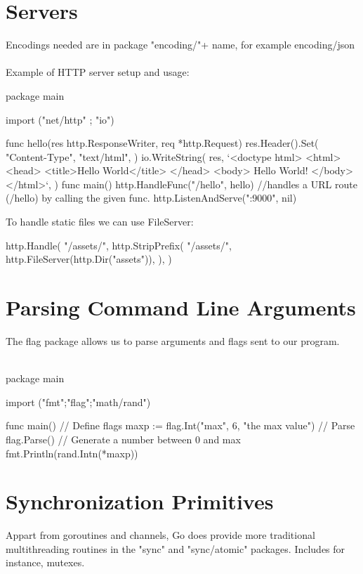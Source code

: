 \documentclass[twoside,a4paper,english]{report}
\begin{document}
\section{Servers}
Encodings needed are in package "encoding/"+ name, for example encoding/json\\\\
Example of HTTP server setup and usage:
\begin{go}
package main

import ("net/http" ; "io")

func hello(res http.ResponseWriter, req *http.Request) {
     res.Header().Set(
           "Content-Type",
           "text/html",
     )
     io.WriteString(
           res,
           `<doctype html>
<html>
  <head>
    <title>Hello World</title>
  </head>
     <body>
           Hello World!
     </body>
</html>`,
    ) 
}
func main() {
    http.HandleFunc("/hello", hello)  //handles a URL route (/hello) by calling the given func.
    http.ListenAndServe(":9000", nil)
}
\end{go}
\vspace{0.7cm}
To handle static files we can use FileServer:
\begin{go}
http.Handle(
    "/assets/",
    http.StripPrefix(
          "/assets/",
          http.FileServer(http.Dir("assets")),
    ),
)
\end{go}
\section{Parsing Command Line Arguments}
The flag package allows us to parse arguments and flags sent to our program. \\\\
\begin{go}
package main

import ("fmt";"flag";"math/rand")

func main() {
    // Define flags
    maxp := flag.Int("max", 6, "the max value")
    // Parse
    flag.Parse()
    // Generate a number between 0 and max
    fmt.Println(rand.Intn(*maxp))
}  
\end{go} 
\section{Synchronization Primitives}
Appart from goroutines and channels, Go does provide more traditional multithreading routines in the "sync" and "sync/atomic" packages. Includes for instance, mutexes.

\nocite{*}

\newpage


\end{document}
